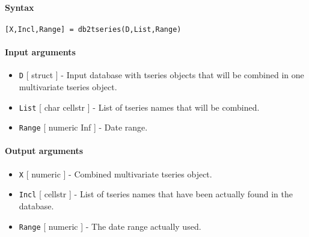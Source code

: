 


	\paragraph{Syntax}\label{syntax}

\begin{verbatim}
[X,Incl,Range] = db2tseries(D,List,Range)
\end{verbatim}

\paragraph{Input arguments}\label{input-arguments}

\begin{itemize}
\item
  \texttt{D} {[} struct {]} - Input database with tseries objects that
  will be combined in one multivariate tseries object.
\item
  \texttt{List} {[} char \textbar{} cellstr {]} - List of tseries names
  that will be combined.
\item
  \texttt{Range} {[} numeric \textbar{} Inf {]} - Date range.
\end{itemize}

\paragraph{Output arguments}\label{output-arguments}

\begin{itemize}
\item
  \texttt{X} {[} numeric {]} - Combined multivariate tseries object.
\item
  \texttt{Incl} {[} cellstr {]} - List of tseries names that have been
  actually found in the database.
\item
  \texttt{Range} {[} numeric {]} - The date range actually used.
\end{itemize}


